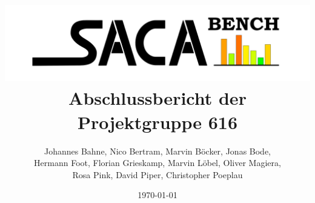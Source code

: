 \title{\includegraphics[width=\textwidth]{kapitel/sacabench_logo.png}\\ Abschlussbericht der Projektgruppe 616}

\author{Johannes Bahne, %
Nico Bertram, %
Marvin Böcker, %
Jonas Bode, \\%
Hermann Foot, %
Florian Grieskamp, %
Marvin Löbel, %
Oliver Magiera, \\%
Rosa Pink, %
David Piper, %
Christopher Poeplau}
\date{\today}

\maketitle
